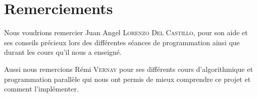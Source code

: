 \chapter{Remerciements}
Nous voudrions remercier Juan Angel \textsc{Lorenzo Del Castillo}, pour son aide et ses conseils précieux lors des différentes séances de programmation ainsi que durant les cours qu'il nous a enseigné.

Aussi nous remercions Rémi \textsc{Vernay} pour ses différents cours d'algorithmique et programmation parallèle qui nous ont permis de mieux comprendre ce projet et comment l'implémenter.